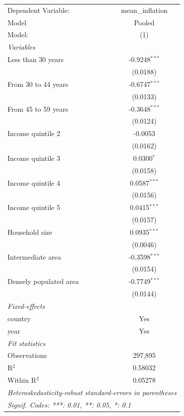 
\begingroup
\centering
\begin{tabular}{lc}
   \tabularnewline \midrule \midrule
   Dependent Variable:    & mean\_inflation\\   
   Model                  & Pooled \\   
   Model:                 & (1)\\  
   \midrule
   \emph{Variables}\\
   Less than 30 years     & -0.9248$^{***}$\\   
                          & (0.0188)\\   
   From 30 to 44 years    & -0.6747$^{***}$\\   
                          & (0.0133)\\   
   From 45 to 59 years    & -0.3648$^{***}$\\   
                          & (0.0124)\\   
   Income quintile 2      & -0.0053\\   
                          & (0.0162)\\   
   Income quintile 3      & 0.0300$^{*}$\\   
                          & (0.0158)\\   
   Income quintile 4      & 0.0587$^{***}$\\   
                          & (0.0156)\\   
   Income quintile 5      & 0.0415$^{***}$\\   
                          & (0.0157)\\   
   Household size         & 0.0935$^{***}$\\   
                          & (0.0046)\\   
   Intermediate area      & -0.3598$^{***}$\\   
                          & (0.0154)\\   
   Densely populated area & -0.7749$^{***}$\\   
                          & (0.0144)\\   
   \midrule
   \emph{Fixed-effects}\\
   country                & Yes\\  
   year                   & Yes\\  
   \midrule
   \emph{Fit statistics}\\
   Observations           & 297,895\\  
   R$^2$                  & 0.58032\\  
   Within R$^2$           & 0.05278\\  
   \midrule \midrule
   \multicolumn{2}{l}{\emph{Heteroskedasticity-robust standard-errors in parentheses}}\\
   \multicolumn{2}{l}{\emph{Signif. Codes: ***: 0.01, **: 0.05, *: 0.1}}\\
\end{tabular}
\par\endgroup


